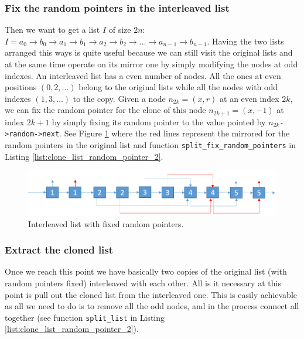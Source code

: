 \subsubsection{Fix the random pointers in the interleaved list}
Then we want to get a list $I$ of size $2n$: $I=a_0 \rightarrow b_0 \rightarrow a_1 \rightarrow b_1 \rightarrow a_2 \rightarrow b_2 \rightarrow \ldots \rightarrow a_{n-1} \rightarrow b_{n-1}$. Having the two lists arranged this ways is quite useful because we can still visit the original lists and at the same time operate on its mirror one by simply modifying the nodes at odd indexes. An interleaved list has a even number of nodes. All the ones at even positions $(0,2,\ldots)$ belong to the original lists while all the nodes with odd indexes $(1,3,\ldots)$ to the copy. Given a node $n_{2k}=(x,r)$ at an even index $2k$, we can fix the random pointer for the clone of this node $n_{2k+1}=(x,-1)$ at index $2k+1$ by simply fixing its random pointer to the value pointed by $n_{2k}$\lstinline[columns=fixed]{->random->next}. See Figure \ref{fig:clone_list_random_pointer:interleaved_fixed} where the red lines represent the mirrored for the random pointers in the original list and function \lstinline[columns=fixed]{split_fix_random_pointers} in Listing \ref{list:clone_list_random_pointer_2}.

\begin{figure}
	\label{fig:clone_list_random_pointer:interleaved_fixed}
	\centering
	\includegraphics[scale=0.5]{sources/clone_list_random_pointer/images/random_list_3}
	\caption{Interleaved list with fixed random pointers.}
\end{figure}

\subsubsection{Extract the cloned list}
Once we reach this point we have basically two copies of the original list (with random pointers fixed) interleaved with each other. All is it necessary at this point is pull out the cloned list from the interleaved one. This is easily achievable as all we need to do is to remove all the odd nodes, and in the process connect all together (see function \lstinline[columns=fixed]{split_list} in Listing \ref{list:clone_list_random_pointer_2}).


